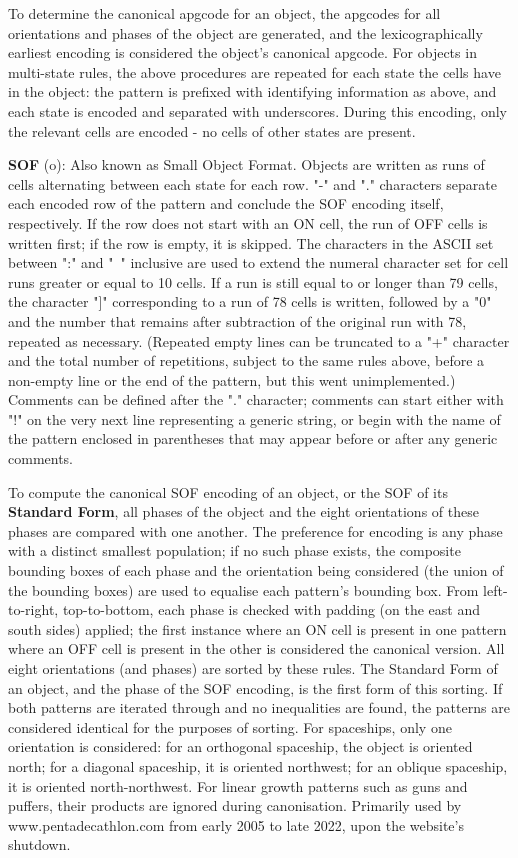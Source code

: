 \documentclass[
	11pt, %
	fleqn, %
	a4paper, %
]{LegrandOrangeBook}
\begin{document}
To determine the canonical apgcode for an object, the apgcodes for all orientations and phases of the object are generated, and the lexicographically earliest encoding is considered the object's canonical apgcode.
For objects in multi-state rules, the above procedures are repeated for each state the cells have in the object: the pattern is prefixed with identifying information as above, and each state is encoded and separated with underscores. During this encoding, only the relevant cells are encoded - no cells of other states are present.

\textbf{SOF} (o): Also known as Small Object Format. Objects are written as runs of cells alternating between each state for each row. "-" and "." characters separate each encoded row of the pattern and conclude the SOF encoding itself, respectively. If the row does not start with an ON cell, the run of OFF cells is written first; if the row is empty, it is skipped.
The characters in the ASCII set between ":" and "~" inclusive are used to extend the numeral character set for cell runs greater or equal to 10 cells. If a run is still equal to or longer than 79 cells, the character "]" corresponding to a run of 78 cells is written, followed by a "0" and the number that remains after subtraction of the original run with 78, repeated as necessary.
(Repeated empty lines can be truncated to a "+" character and the total number of repetitions, subject to the same rules above, before a non-empty line or the end of the pattern, but this went unimplemented.)
Comments can be defined after the "." character; comments can start either with "!" on the very next line representing a generic string, or begin with the name of the pattern enclosed in parentheses that may appear before or after any generic comments.

To compute the canonical SOF encoding of an object, or the SOF of its \textbf{Standard Form}, all phases of the object and the eight orientations of these phases are compared with one another.
The preference for encoding is any phase with a distinct smallest population; if no such phase exists, the composite bounding boxes of each phase and the orientation being considered (the union of the bounding boxes) are used to equalise each pattern's bounding box. From left-to-right, top-to-bottom, each phase is checked with padding (on the east and south sides) applied; the first instance where an ON cell is present in one pattern where an OFF cell is present in the other is considered the canonical version. All eight orientations (and phases) are sorted by these rules. The Standard Form of an object, and the phase of the SOF encoding, is the first form of this sorting. If both patterns are iterated through and no inequalities are found, the patterns are considered identical for the purposes of sorting. For spaceships, only one orientation is considered: for an orthogonal spaceship, the object is oriented north; for a diagonal spaceship, it is oriented northwest; for an oblique spaceship, it is oriented north-northwest. For linear growth patterns such as guns and puffers, their products are ignored during canonisation. Primarily used by www.pentadecathlon.com from early 2005 to late 2022, upon the website's shutdown.
\end{document}
